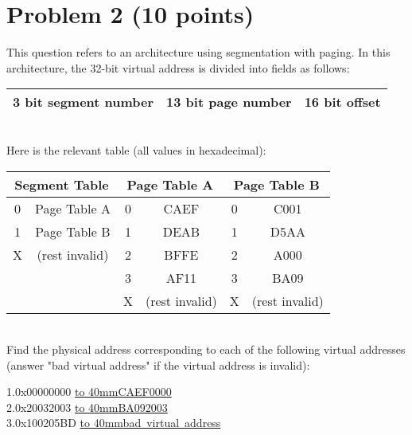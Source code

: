 \documentclass[answers]{exam}
\begin{document}
\section*{Problem 2 (10 points)}
This question refers to an architecture using segmentation with paging. In this architecture, the 32-bit virtual address is divided into fields as follows:
\begin{table}[h!]
  \begin{center}
    \begin{tabular}{|c|c|c|} 
      \hline
      3 bit segment number &	13 bit page number 	& 16 bit offset\\
      \hline
    \end{tabular}
  \end{center}
\end{table}
\\Here is the relevant table (all values in hexadecimal):
\begin{table}[h!]
  \begin{center}
    \begin{tabular}{|c|c|c|c|c|c|}
        \hline
        \multicolumn{2}{|c|}{Segment Table}& \multicolumn{2}{c|}{Page Table A}&\multicolumn{2}{c|}{Page Table B}\\
         \hline
        0&   Page Table A&  0&	CAEF&	0&	C001\\
         \hline
        1& 	 Page Table B&	1&	DEAB&	1&	D5AA\\
         \hline
        X&	(rest invalid)&	2&	BFFE&	2&	A000\\
         \hline
		&                 & 3&	AF11&	3&	BA09\\
		 \hline
	    &	              & X&	(rest invalid)&	X&	(rest invalid)\\
	     \hline
    \end{tabular}
  \end{center}
\end{table}
\\Find the physical address corresponding to each of the following virtual addresses (answer "bad virtual address" if the virtual address is invalid):\\
\begin{center}
1.0x00000000  \underline{\hbox to 40mm{CAEF0000}}
\\2.0x20032003  \underline{\hbox to 40mm{BA092003}}
\\3.0x100205BD  \underline{\hbox to 40mm{bad\ virtual\ address}}
\end{center}
\end{document}
